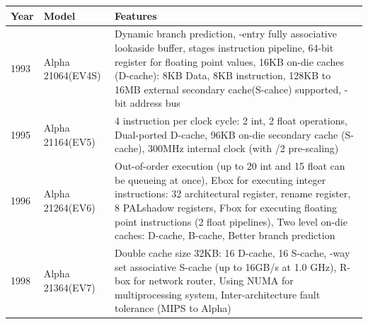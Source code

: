 \documentclass[letterpaper,10pt,titlepage]{article}
\begin{document}
\begin{center}
   \begin{longtable}{l l p{10cm}}
      \textbf{Year} & \textbf{Model}      & \textbf{Features}\\ \hline

      1993 & Alpha 21064\newline(EV4S)  & Dynamic branch prediction,
      					  \newline
      					  32-entry fully associative lookaside buffer,
					  \newline
					  5 stages instruction pipeline,
				          \newline
					  32 64-bit register for floating point values,
					  \newline
					  16KB on-die caches (D-cache): 8KB Data, 
					  8KB instruction,
					  \newline
					  128KB to 16MB external secondary cache(S-cahce) supported,
					  \newline
					  34-bit address bus\\

      \hline
      1995 & Alpha 21164\newline(EV5)   & 4 instruction per clock cycle: 2 int, 2 float operations,
      					  \newline
					  Dual-ported D-cache,
					  \newline
					  96KB on-die secondary cache (S-cache),
					  \newline
					  300MHz internal clock (with /2 pre-scaling)\\
      \hline
      1996 & Alpha 21264\newline(EV6)   & Out-of-order execution (up to 20 int and 15 float can be
      					  queueing at once), 
					  \newline
					  Ebox for executing integer instructions: 32 architectural register,
					  \newline
					  40 rename register, 8 PALshadow registers,
					  \newline
					  Fbox for executing floating point instructions (2 float pipelines),
					  \newline
					  Two level on-die caches: D-cache, B-cache,
					  \newline
					  Better branch prediction\\
      \hline
      1998& Alpha 21364\newline(EV7)   &  Double cache size 32KB: 16 D-cache, 16 S-cache,
      					  \newline
					  7-way set associative S-cache (up to 16GB/s at 1.0 GHz),
					  \newline
					  R-box for network router, Using NUMA for multiprocessing system,
					  \newline
					  Inter-architecture fault tolerance (MIPS to Alpha)\\
      \hline
   \end{longtable}
\end{center}
\end{document}
